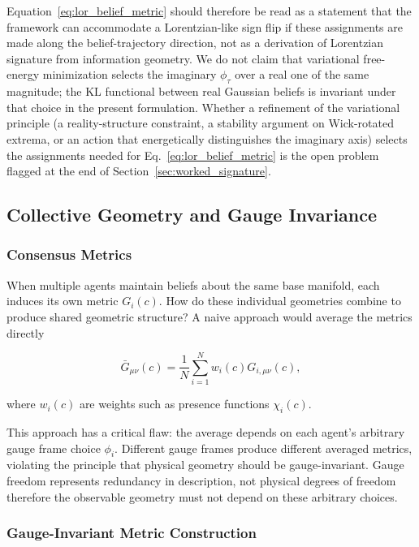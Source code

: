 \documentclass[11pt]{article}
\begin{document}
Equation~\eqref{eq:lor_belief_metric} should therefore be read as a statement that the framework can accommodate a Lorentzian-like sign flip if these assignments are made along the belief-trajectory direction, not as a derivation of Lorentzian signature from information geometry. We do not claim that variational free-energy minimization selects the imaginary $\phi_\tau$ over a real one of the same magnitude; the KL functional between real Gaussian beliefs is invariant under that choice in the present formulation. Whether a refinement of the variational principle (a reality-structure constraint, a stability argument on Wick-rotated extrema, or an action that energetically distinguishes the imaginary axis) selects the assignments needed for Eq.~\eqref{eq:lor_belief_metric} is the open problem flagged at the end of Section~\ref{sec:worked_signature}.

\subsection{Collective Geometry and Gauge Invariance}

\subsubsection{Consensus Metrics}

When multiple agents maintain beliefs about the same base manifold, each induces its own metric $G_i(c)$. How do these individual geometries combine to produce shared geometric structure? A naive approach would average the metrics directly

\begin{equation}
\bar{G}_{\mu\nu}(c) = \frac{1}{N}\sum_{i=1}^N w_i(c) G_{i,\mu\nu}(c),
\end{equation}

where $w_i(c)$ are weights such as presence functions $\chi_i(c)$.

This approach has a critical flaw: the average depends on each agent's arbitrary gauge frame choice $\phi_i$. Different gauge frames produce different averaged metrics, violating the principle that physical geometry should be gauge-invariant. Gauge freedom represents redundancy in description, not physical degrees of freedom therefore the observable geometry must not depend on these arbitrary choices.

\subsubsection{Gauge-Invariant Metric Construction}
\label{sec:consensus_metric}
\end{document}
